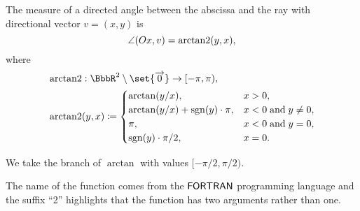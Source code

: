 \begin{proposition}\label{thm:arctantwo}
  The measure of a directed angle between the abscissa and the ray with directional vector \( v = (x, y) \) is
  \begin{equation}
    \angle(Ox, v) = \operatorname{arctan2}(y, x),
  \end{equation}
  where
  \begin{equation*}
    \begin{aligned}
       &\arctantwo: \BbbR^2 \setminus \set{ \vect 0 } \to [-\pi, \pi), \\
       &\arctantwo(y, x) \coloneqq \begin{cases}
        \arctan(y / x),                     &x > 0, \\
        \arctan(y / x) + \sgn(y) \cdot \pi, &x < 0 \T{and} y \neq 0, \\
        \pi,                                     &x < 0 \T{and} y = 0, \\
        \sgn(y) \cdot \pi / 2,              &x = 0. \\
      \end{cases}
    \end{aligned}
  \end{equation*}

  We take the branch of \( \arctan \) with values \( [-\pi / 2, \pi / 2) \).

  The name of the function comes from the \( \textsf{FORTRAN} \) programming language and the suffix \enquote{2} highlights that the function has two arguments rather than one.
\end{proposition}
